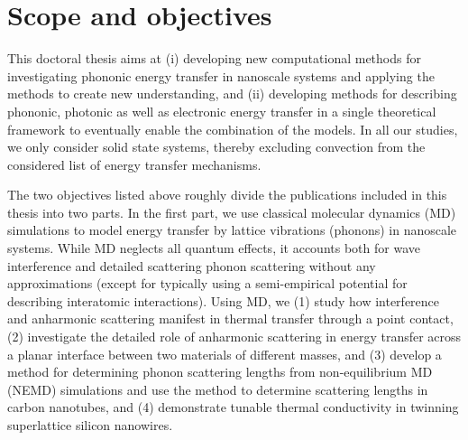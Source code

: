 


\section{Scope and objectives}

This doctoral thesis aims at (i) developing new computational methods for investigating phononic energy transfer in nanoscale systems and applying the methods to create new understanding, and (ii) developing methods for describing phononic, photonic as well as electronic energy transfer in a single theoretical framework to eventually enable the combination of the models. In all our studies, we only consider solid state systems, thereby excluding convection from the considered list of energy transfer mechanisms. %

The two objectives listed above roughly divide the publications included in this thesis into two parts. In the first part, we use classical molecular dynamics (MD) simulations to model energy transfer by lattice vibrations (phonons) in nanoscale systems. While MD neglects all quantum effects, it accounts both for wave interference and detailed scattering phonon scattering without any approximations (except for typically using a semi-empirical potential for describing interatomic interactions). Using MD, we (1) study how interference and anharmonic scattering manifest in thermal transfer through a point contact, (2) investigate the detailed role of anharmonic scattering in energy transfer across a planar interface between two materials of different masses, and (3) develop a method for determining phonon scattering lengths from non-equilibrium MD (NEMD) simulations and use the method to determine scattering lengths in carbon nanotubes, and (4) demonstrate tunable thermal conductivity in twinning superlattice silicon nanowires.

